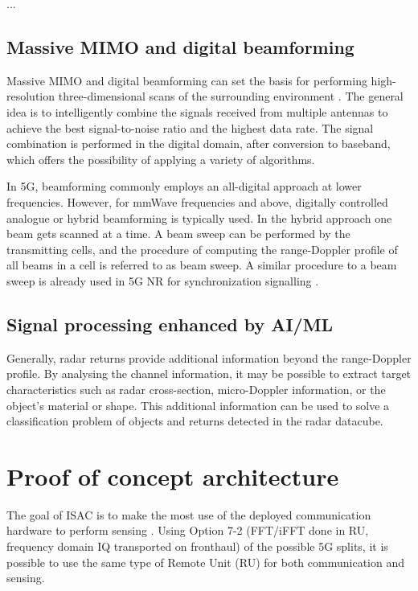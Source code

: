 	...
	
	\subsection{Massive MIMO and digital beamforming}
	
	Massive MIMO and digital beamforming can set the basis for performing high-resolution three-dimensional scans of the surrounding environment \cite{MIMO-next-gen}.
	The general idea is to intelligently combine the signals received from multiple antennas to achieve the best signal-to-noise ratio and the highest data rate. The signal combination is performed in the digital domain, after conversion to baseband, which offers the possibility of applying a variety of algorithms.
	
	In 5G, beamforming commonly employs an all-digital approach at lower frequencies. However, for mmWave frequencies and above, digitally controlled analogue or hybrid beamforming is typically used. In the hybrid approach one beam gets scanned at a time. A beam sweep can be performed by the transmitting cells, and the procedure of computing the range-Doppler profile of all beams in a cell is referred to as beam sweep. A similar procedure to a beam sweep is already used in 5G NR for synchronization signalling \cite{Wild_Braun_Viswanathan_2021}.
	
	\subsection{Signal processing enhanced by AI/ML}
	Generally, radar returns provide additional information beyond the range-Doppler profile. By analysing the channel information, it may be possible to extract target characteristics such as radar cross-section, micro-Doppler information, or the object's material or shape.
	This additional information can be used to solve a classification problem of objects and returns detected in the radar datacube.


\section{Proof of concept architecture}
	\label{sec:intro-PoCarchitecture}
	
	The goal of ISAC is to make the most use of the deployed communication hardware to perform sensing \cite{Wild_Grudnitsky_Mandelli_Henninger_Guan_Schaich_2023}. Using Option 7-2 (FFT/iFFT done in RU, frequency domain IQ transported on fronthaul) of the possible 5G splits, it is possible to use the same type of Remote Unit (RU) for both communication and sensing.
	
